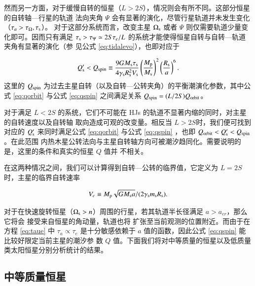 然而另一方面，对于缓慢自转的恒星（$L>2S$），情况则会有所不同。这部分恒星的自转轴---行星的轨道
法向夹角 $\Psi$ 会有显著的演化，尽管行星轨道并未发生变化（$\tau_a >\tau_{\Omega},\tau_{\mathrm{s}}$）。
对于这部分系统而言，改变主星 $\Omega_\mathrm{s}$ 或者 $\Psi$ 则仅需要轨道少量变化即可。因而只有满足
$\tau_\mathrm{s}>\tau_\Psi \simeq 2S \tau_e/L$ 的系统才能使得恒星自转与自转---轨道夹角有显著的演化（参
见公式 \ref{eq:tidalevo}），也即对应于

\begin{equation}  \label{eq:qspin}
Q_\mathrm{s}^\prime < Q_{\rm spin} \equiv {9 G M_\mathrm{s} \tau_\mathrm{s} 
\over 4 \gamma_\mathrm{s} R_\mathrm{s}^2 V_\mathrm{s}} 
\left( {M_\mathrm{p} \over M_\mathrm{s}} \right)^2 
\left({R_\mathrm{s} \over a} \right)^{6}.
\end{equation}
这里的 $Q_{\rm spin} $ 为过去主星自转（以及自转---公转夹角）的平衡潮演化参数，其中公式 \ref{eq:qorbit} 
与公式 \ref{eq:qspin} 之间满足关系 $Q_{\rm spin} = (L/2S) Q_{\rm orbit}$。

对于满足 $L< 2S$ 的系统，它们不可能在 HJs 的轨道不显著内缩的同时，对主星的自转速度以及自转轴
取向造成可观的改变量。相反当 $L>2S$时，我们便可找到对应的 $Q_\mathrm{s}^\prime $ 来同时满足公式 
\ref{eq:qorbit} 与公式 \ref{eq:qspin} ，也即 $Q_{\rm orbit} < Q_\mathrm{s}^\prime < Q_{\rm spin}$。在此范围
内热木星公转法向与主星自转轴方向可被潮汐趋同化。需要说明的是，这里的条件和真实的恒星 $Q$ 值并
不相关。

在这两种情况之间，我们可以计算得到自转---公转的临界值，它定义为 $L=2S $时，主星的临界自转速率

\begin{equation} \label{eq:vc}
V_c \equiv {M_\mathrm{p} {\sqrt{G M_\mathrm{s} a}} /( 2 \gamma_\mathrm{s} m_\mathrm{s}R_\mathrm{s}}).
\end{equation} 

对于在快速旋转恒星（$\Omega_\mathrm{s} > n$）周围的行星，若其轨道半长径满足 $a > a_{cr}$，那么它将会
接受来自恒星的角动量，轨道也将	扩张至当前观测的位置附近。而由于在方程 \ref{eq:taue} 中 $\tau_a 
\propto \tau_e$ 是十分敏感依赖于 $a$ 值的函数，因此公式 \ref{eq:qspin} 能比较好限定当前主星的潮汐参
数 $Q$ 值。下面我们将对中等质量的恒星以及低质量类太阳恒星分别分析统计的结果。

\subsection{中等质量恒星} \label{sec:hotstar}

